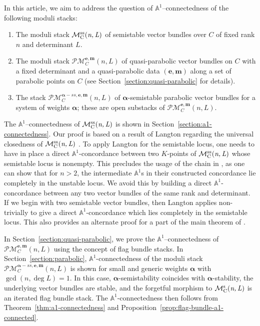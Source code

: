 \documentclass[12pt,reqno]{amsart}
\DeclareMathOperator{\mnlss}{\mc{M}^{ss}_C(\textit{n,\,L})}
\DeclareMathOperator{\mnls}{\mc{M}^{s}_C(\textit{n,\,L})}
\newcommand{\mc}[1]{\mathcal{#1}}
\newcommand{\bb}[1]{\mathbb{#1}}
\theoremstyle{definition}
\numberwithin{equation}{section}
\begin{document}
	In this article, we aim to address the question of $\bb{A}^1$--connectedness
	of the following moduli stacks:
	\begin{enumerate}[$\bullet$]
		\item The moduli stack $\mnlss$ of semistable vector bundles over $C$ of
		fixed rank $n$ and determinant $L$.
		\item The moduli stack $\mc{PM}_C^{\boldsymbol{e,m}}(n,L)$ of
		quasi-parabolic vector bundles on $C$ with a fixed determinant and a
		quasi-parabolic data $(\boldsymbol{e,m})$ along a set of parabolic points
		on $C$ (see Section~\ref{section:quasi-parabolic} for details).
		\item The stack $\mc{PM}_C^{\boldsymbol{\alpha}-ss,\boldsymbol{e,m}}(n,L)$
		of $\boldsymbol{\alpha}$-semistable parabolic vector bundles for a system
		of weights $\boldsymbol{\alpha}$; these are open substacks of
		$\mc{PM}_C^{\boldsymbol{e,m}}(n,L)$.
	\end{enumerate}
	The $\bb{A}^1$--connectedness of $\mnlss$ is shown in
	Section~\ref{section:a1-connectedness}. Our proof is based on a result of
	Langton regarding the universal closedness of $\mnlss$ \cite{L75}. To apply
	Langton for the semistable locus, one needs to have in place a direct
	$\bb{A}^1$-concordance between two $K$-points of $\mnlss$ whose semistable
	locus is nonempty. This precludes the usage of the chain in \cite{HY24}, as
	one can show that for $n>2$, the intermediate $\bb{A}^1$s in their
	constructed concordance lie completely in the unstable locus. We avoid this
	by building a direct $\bb{A}^1$-concordance between any two vector bundles
	of the same rank and determinant. If we begin with two semistable vector
	bundles, then Langton applies non-trivially to give a direct
	$\bb{A}^1$-concordance which lies completely in the semistable locus. This
	also provides an alternate proof for a part of the main theorem of
	\cite{HY24}.
	
	In Section~\ref{section:quasi-parabolic}, we prove the
	$\bb{A}^1$--connectedness of $\mc{PM}_C^{\boldsymbol{e,m}}(n,L)$ using the
	concept of flag bundle stacks. In Section~\ref{section:parabolic}, 
	$\bb{A}^1$-connectedness of the moduli stack
	$\mc{PM}_C^{\boldsymbol{\alpha}-ss,\boldsymbol{e,m}}(n,L)$ is shown for small and
	generic weights $\boldsymbol{\alpha}$ with $\gcd(n, \deg L) = 1$. In this
	case, $\boldsymbol{\alpha}$-semistability coincides with
	$\boldsymbol{\alpha}$-stability, the underlying vector bundles are stable,
	and the forgetful morphism to $\mnls$ is an iterated flag bundle stack. The
	$\bb{A}^1$-connectedness then follows from Theorem~\ref{thm:a1-connectedness}
	and Proposition~\ref{prop:flag-bundle-a1-connected}.
	
\end{document}
